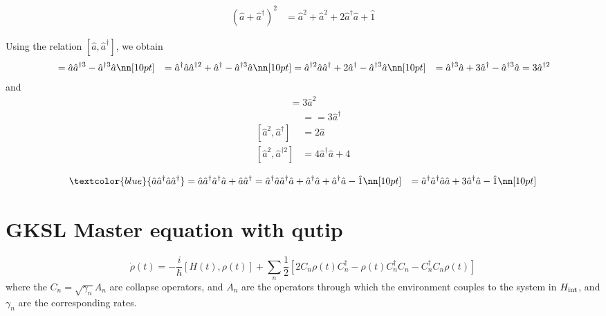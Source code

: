 \begin{align}
    (\hat{a}+\hat{a}^{\dag})^2
    &=\hat{a}^2+\hat{a}^2+2\hat{a}^{\dag}\hat{a}+\hat{1}
\end{align}

Using the relation $[\hat{a},\hat{a}^{\dag}]$, we obtain
\begin{align}
    [\hat{a},\hat{a}^{\dag 3}]&=\hat{a}\hat{a}^{\dag 3}-\hat{a}^{\dag 3}\hat{a}\nn[10pt]
    &=\hat{a}^{\dag}\hat{a}\hat{a}^{\dag 2}+\hat{a}^{\dag}-\hat{a}^{\dag 3}\hat{a}\nn[10pt]
    &=\hat{a}^{\dag 2}\hat{a}\hat{a}^{\dag}+2\hat{a}^{\dag}-\hat{a}^{\dag 3}\hat{a}\nn[10pt]
    &=\hat{a}^{\dag 3}\hat{a}+3\hat{a}^{\dag}-\hat{a}^{\dag 3}\hat{a}
    =3\hat{a}^{\dag 2}
\end{align}
and
\begin{align}
    [\hat{a}^3,\hat{a}^{\dag}]
    =3\hat{a}^{2}
\end{align}
\begin{align}
    [\hat{a},\hat{a}^{\dag 2}]&=
    =3\hat{a}^{\dag}\\[10pt]
     [\hat{a}^2,\hat{a}^{\dag}]
    &=2\hat{a}\\[10pt]
    [\hat{a}^2,\hat{a}^{\dag 2}]&=4\hat{a}^{\dag}\hat{a}+4
\end{align}

\begin{align}
    \textcolor{blue}{\hat{a}\hat{a}^{\dag}\hat{a}\hat{a}^{\dag}}
    &=\hat{a}\hat{a}^{\dag}\hat{a}^{\dag}\hat{a}+\hat{a}\hat{a}^{\dag}
    =\hat{a}^{\dag}\hat{a}\hat{a}^{\dag}\hat{a}+\hat{a}^{\dag}\hat{a}+\hat{a}^{\dag}\hat{a}-\hat{1}\nn[10pt]
    &=\hat{a}^{\dag}\hat{a}^{\dag}\hat{a}\hat{a}+3\hat{a}^{\dag}\hat{a}-\hat{1}\nn[10pt]
\end{align}


\section{GKSL Master equation with qutip}
\begin{equation}
    \dot\rho(t)=-\frac{i}{\hbar}[H(t),\rho(t)]+\sum_n \frac{1}{2} \left[2 C_n \rho(t) C_n^\dagger - \rho(t) C_n^\dagger C_n - C_n^\dagger C_n \rho(t)\right]
\end{equation}
where the $C_n = \sqrt{\gamma_n} A_n$ are collapse operators, and $A_n$ are the operators through which the environment couples to the system in $H_{\rm int}$, and $\gamma_n$ are the corresponding rates.  
